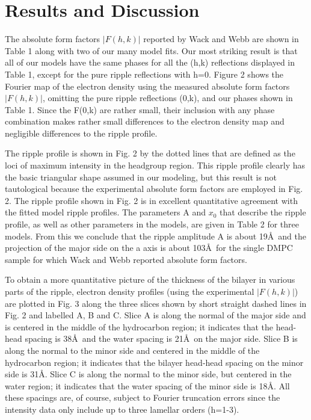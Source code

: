 \section{Results and Discussion}

The absolute form factors $|F(h,k)|$ reported by Wack and Webb \cite{Wac89a} 
are shown in Table 1 along with two of our many model fits.
Our most striking result is that all of our models have the same
phases for all the (h,k) reflections displayed in Table 1,
except for the pure ripple
reflections with h=0.  Figure 2 shows the Fourier map
of the electron density using the measured \cite{Wac89a} absolute form factors
$|F(h,k)|$, omitting the pure ripple reflections (0,k),
and our phases shown in Table 1.
Since the F(0,k) are rather small, their inclusion with any phase
combination makes rather small differences to the electron
density map and negligible differences to the ripple profile.

The ripple profile is shown in Fig. 2 by the dotted lines
that are defined as the loci of maximum intensity in the headgroup
region.  This ripple profile clearly has the basic triangular shape
assumed in our modeling, but this result is not tautological because 
the experimental 
absolute form factors are employed in Fig. 2.
The ripple profile shown in Fig. 2 is in excellent quantitative
agreement with the fitted model ripple profiles.  The parameters
A and $x_0$ that describe the ripple profile, as well as other
parameters in the models, are given in Table 2 for three models.
From this we conclude that the ripple amplitude A is about 19\AA\
and the projection of the major side on the a axis is about 103\AA\
for the single DMPC sample for which Wack and Webb \cite{Wac89a}
reported absolute form factors.

To obtain a more quantitative picture of the thickness of the
bilayer in various parts of the ripple, electron density profiles
(using the experimental $|F(h,k)|$)
are plotted in Fig. 3 along the three slices shown by short straight dashed
lines in Fig. 2 and labelled A, B and C.
Slice A is along the normal of the major side and is centered in the
middle of the hydrocarbon region; it indicates that the head-head 
spacing is 38\AA\ and the water spacing is 21\AA\ on the major side.
Slice B is along the normal to the minor side and centered
in the middle of the hydrocarbon region; it indicates that
the bilayer head-head spacing on the minor side is 31\AA.
Slice C is along the normal to the minor side, but centered in
the water region; it indicates that the water spacing of the
minor side is 18\AA.
All these spacings are, of course, subject to Fourier truncation
errors since the intensity data only include up to three lamellar orders 
(h=1-3).

